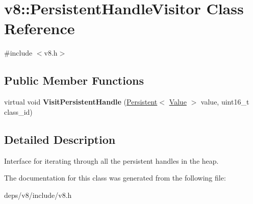 \hypertarget{classv8_1_1_persistent_handle_visitor}{}\section{v8\+:\+:Persistent\+Handle\+Visitor Class Reference}
\label{classv8_1_1_persistent_handle_visitor}


{\ttfamily \#include $<$v8.\+h$>$}

\subsection*{Public Member Functions}
\begin{DoxyCompactItemize}
\item 
\hypertarget{classv8_1_1_persistent_handle_visitor_a6b625a89352004eaedc46112d6e456e2}{}virtual void {\bfseries Visit\+Persistent\+Handle} (\hyperlink{classv8_1_1_persistent}{Persistent}$<$ \hyperlink{classv8_1_1_value}{Value} $>$ value, uint16\+\_\+t class\+\_\+id)\label{classv8_1_1_persistent_handle_visitor_a6b625a89352004eaedc46112d6e456e2}

\end{DoxyCompactItemize}


\subsection{Detailed Description}
Interface for iterating through all the persistent handles in the heap. 

The documentation for this class was generated from the following file\+:\begin{DoxyCompactItemize}
\item 
deps/v8/include/v8.\+h\end{DoxyCompactItemize}
